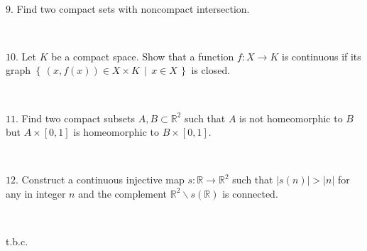 \documentclass{article}
\def\noi{\noindent}%
\def\RR{\mathbb{R}}%
\def\i{\subset}
\def\:{\colon}
\newcommand{\set}[2]{\left\{\,#1\,\middle|\,#2\,\right\}}
\begin{document}
\ 

\noi $9.$ Find two compact sets with noncompact intersection.

\ 

\noi $10.$ Let $K$ be a compact space.
Show that a function $f\:X\to K$ is continuous if its graph $\set{(x,f(x))\in X\times K}{x\in X}$ is closed. 

\ 

\noi $11$. Find two compact subsets $A,B\i\RR^2$ such that 
$A$ is not homeomorphic to $B$ but $A\times[0,1]$ is homeomorphic to $B\times[0,1]$.

\ 

\noi $12$. Construct a continuous injective map $s\:\RR\to\RR^2$ such that $|s(n)|>|n|$ for any in integer $n$ and the complement $\RR^2\backslash s(\RR)$ is connected. 

\ 

\noi t.b.c.
\end{document}
